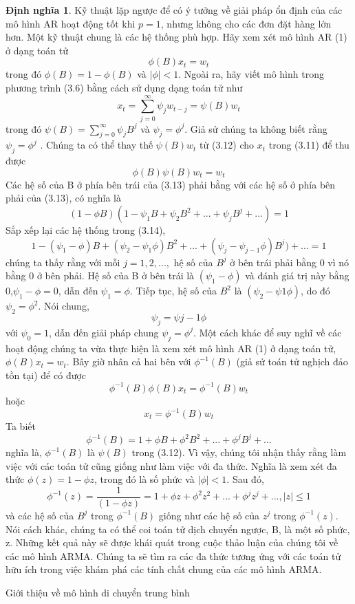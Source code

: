 \documentclass[12pt, a4paper,oneside]{book}
\theoremstyle{definition}
\newtheorem{dn}[theo]{Định nghĩa}
\begin{document}
\begin{dn}
	Kỹ thuật lặp ngược để có ý tưởng về giải pháp ổn định của các mô hình AR hoạt động tốt khi $p = 1$, nhưng không cho các đơn đặt hàng lớn hơn. Một kỹ thuật chung là các hệ thống phù hợp. Hãy xem xét mô hình AR (1) ở dạng toán tử 
	$$\phi(B)x_{t}= w_{t}$$
	trong đó $\phi(B) = 1- \phi(B)$ và $|\phi| <1$. Ngoài ra, hãy viết mô hình trong phương trình (3.6) bằng cách sử dụng dạng toán tử như 
	$$x_{t}= \sum_{j=0}^{\infty}\psi_{j}w_{t-j} = \psi(B)w_{t}$$
	trong đó $\psi(B)= \sum_{j=0}^{\infty}\psi_{j}B^{j}$ và $\psi_{j} = \phi^{j}$. Giả sử chúng ta không biết rằng $\psi_{j} = \phi^{j}$ . Chúng ta có thể thay thế $\psi(B)w_{t}$ từ (3.12) cho $x_{t}$ trong (3.11) để thu được 
	$$\phi(B)\psi(B)w_{t} = w_{t}$$
	Các hệ số của B ở phía bên trái của (3.13) phải bằng với các hệ số ở phía bên phải của (3.13), có nghĩa là 
	$$(1- \phi B)(1-\psi_{1}B +\psi_{2}B^{2}+...+\psi_{j}B^{j}+...)=1$$
	Sắp xếp lại các hệ thống trong (3.14),
	$$1- (\psi_{1} -\phi)B + (\psi_{2}-\psi_{1}\phi)B^{2}+...+ (\psi_{j}-\psi_{j-1}\phi)B^{j})+...=1$$
	chúng ta thấy rằng với mỗi $j = 1, 2, ...,$ hệ số của $B^{j}$ ở bên trái phải bằng 0 vì nó bằng 0 ở bên phải. Hệ số của B ở bên trái là $(\psi_{1}-\phi)$ và đánh giá trị này bằng 0,$\psi_{1} −\phi = 0$, dẫn đến $\psi_{1} = \phi$. Tiếp tục, hệ số của $B^{2}$ là $(\psi_{2}-\psi{1}\phi)$, do đó $\psi_{2}= \phi^{2}$. Nói chung,
	$$\psi_{j}= \psi{j-1}\phi$$
	với $\psi_{0} = 1$, dẫn đến giải pháp chung $\psi_{j} = \phi^{j}$.
	Một cách khác để suy nghĩ về các hoạt động chúng ta vừa thực hiện là xem xét mô hình AR (1) ở dạng toán tử,$\phi(B)x_{t} = w_{t}$. Bây giờ nhân cả hai bên với $\phi^{-1}(B)$ (giả sử toán tử nghịch đảo tồn tại) để có được 
	$$\phi^{-1}(B)\phi(B)x_{t}= \phi^{-1}(B)w_{t}$$
	hoặc
	$$x_{t}= \phi^{-1}(B)w_{t}$$
	Ta biết
	$$\phi^{-1}(B)= 1 +\phi B+ \phi^{2}B^{2}+ ...+ \phi^{j}B^{j}+...$$
	nghĩa là, $\phi^{-1}(B)$ là $\psi(B)$ trong (3.12). Vì vậy, chúng tôi nhận thấy rằng làm việc với các toán tử cũng giống như làm việc với đa thức. Nghĩa là xem xét đa thức $\phi(z) = 1-\phi z$, trong đó là số phức và $|\phi|<1$. Sau đó,
	$$\phi^{-1}(z)= \dfrac{1}{(1-\phi z)}= 1+ \phi z+ \phi^{2} z^{2}+...+ \phi^{j} z^{j}+..., |z|\leq1$$
	và các hệ số của $B^{j}$ trong $\phi^{-1}(B)$ giống như các hệ số của $z^{j}$ trong $\phi^{-1}(z)$. Nói cách khác, chúng ta có thể coi toán tử dịch chuyển ngược, B, là một số phức, z. Những kết quả này sẽ được khái quát trong cuộc thảo luận của chúng tôi về các mô hình ARMA. Chúng ta sẽ tìm ra các đa thức tương ứng với các toán tử hữu ích trong việc khám phá các tính chất chung của các mô hình ARMA.
\end{dn}
Giới thiệu về mô hình di chuyển trung bình
\end{document}
